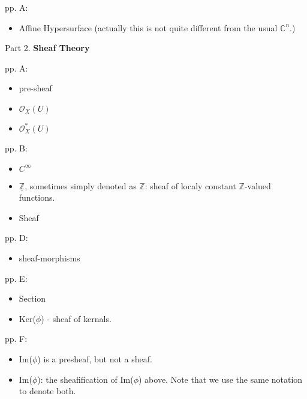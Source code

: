 \documentclass{book}
\numberwithin{equation}{subsection} %
\theoremstyle{definition}
\begin{document}
pp. A:
    \begin{itemize}
        \item Affine Hypersurface (actually this is not quite different from the usual $\mathbb{C}^n$.)
    \end{itemize}
	
Part 2. \textbf{Sheaf Theory}

pp. A:
	\begin{itemize}
		\item pre-sheaf
		\item $\mathcal{O}_X(U)$
		\item $\mathcal{O}^*_X(U)$
	\end{itemize}
pp. B:
	\begin{itemize}
		\item $C^{\infty}$
		\item $\mathbb{\underline{Z}}$, sometimes simply denoted as $\mathbb{Z}$: sheaf of localy constant $\mathbb{Z}$-valued functions.
		\item Sheaf
	\end{itemize}
pp. D:
	\begin{itemize}
		\item sheaf-morphisms
	\end{itemize}
pp. E:
	\begin{itemize}
		\item Section
		\item Ker($\phi$) - sheaf of kernals.
	\end{itemize}
pp. F:
	\begin{itemize}
		\item Im($\phi$) is a presheaf, but not a sheaf.
		\item Im($\phi$): the sheafification of Im($\phi$) above. Note that we use the same notation to denote both.
	\end{itemize}
	
\end{document}
